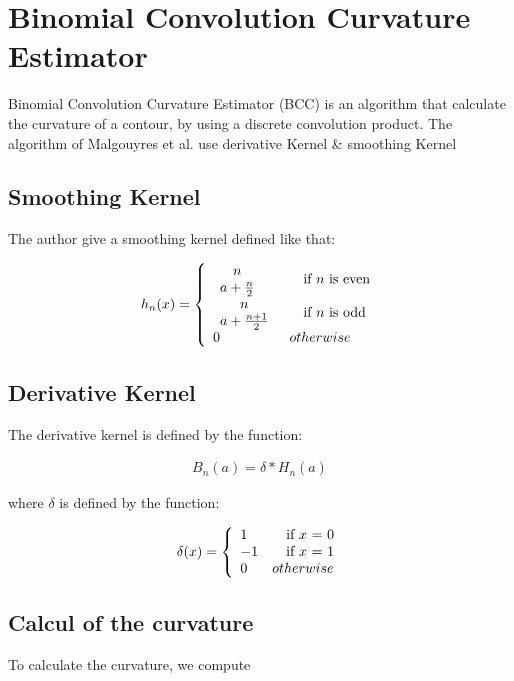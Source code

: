 \newpage
\section{Binomial Convolution Curvature Estimator}

Binomial Convolution Curvature Estimator (BCC) is an algorithm that calculate the curvature of a contour, by using a discrete convolution product. \newline
The algorithm of Malgouyres et al. use derivative Kernel \& smoothing Kernel \cite{malgouyres2008binomial}

\subsection{Smoothing Kernel}
The author give a smoothing kernel defined like that:


\[ h_{n}(x) = \left\{ 
  \begin{array}{l l}
    \begin{array}{c}
      n \\
      a + \frac{n}{2}
    \end{array} & \quad \text{if $n$ is even}\\
    \begin{array}{c}
      n \\
      a + \frac{n+1}{2}
    \end{array}& \quad \text{if $n$ is odd}\\
    0 & otherwise
  \end{array} \right.\]

 \subsection{Derivative Kernel}
 The derivative kernel is defined by the function:

	\begin{align*}
	B_{n}(a) = \delta * H_{n}(a) 
	\end{align*}

where $ \delta $ is defined by the function:

\[ \delta(x) = \left\{ 
  \begin{array}{l l}
  1 & \quad \text{if $x$ = 0}\\
  -1 & \quad \text{if $x$ = 1}\\
  0 & otherwise
  \end{array} \right.\]
\subsection{Calcul of the curvature}
 To calculate the curvature, we compute

